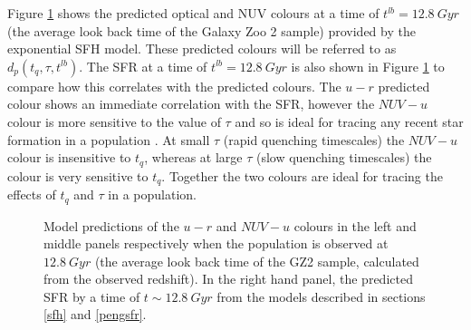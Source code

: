 \documentclass{mn2e}
\begin{document}
Figure \ref{pred} shows the predicted optical and NUV colours at a time of $t^{lb} = 12.8 ~Gyr$ (the average look back time of the Galaxy Zoo 2 sample) provided by the exponential SFH model. These predicted colours will be referred to as $d_{p}(t_{q}, \tau, t^{lb})$. The SFR at a time of $t^{lb}=12.8~Gyr$ is also shown in Figure \ref{pred} to compare how this correlates with the predicted colours. The $u-r$ predicted colour shows an immediate correlation with the SFR, however the $NUV-u$ colour is more sensitive to the value of $\tau$ and so is ideal for tracing any recent star formation in a population . At small $\tau$ (rapid quenching timescales) the $NUV-u$ colour is insensitive to $t_{q}$, whereas at large $\tau$ (slow quenching timescales) the colour is very sensitive to $t_{q}$. Together the two colours are ideal for tracing the effects of $t_{q}$ and $\tau$ in a population. 

\begin{figure}
\caption{Model predictions of the $u-r$ and $NUV-u$ colours in the left and  middle panels respectively when the population is observed at $12.8~Gyr$ (the average look back time of the GZ2 sample, calculated from the observed redshift). In the right hand panel, the predicted SFR by a time of $t \sim 12.8 ~Gyr$  from the models described in sections \ref{sfh} and \ref{pengsfr}.}
\label{pred}
\end{figure}
\end{document}
